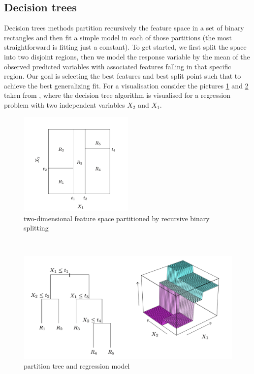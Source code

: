 \subsection{Decision trees}
Decision trees methods partition recursively the feature space in a set of binary rectangles and then fit a simple model in each of those partitions (the most straightforward is fitting just a constant).
To get started, we first split the space into two disjoint regions, then we model the response variable by the mean of the observed predicted variables with associated features falling in that specific region. Our goal is selecting the best features and best split point such that to achieve the best generalizing fit.
For a visualisation consider the pictures \ref{fig:elements_statistical_learning1} and \ref{fig:elements_statistical_learning2} taken from \cite{hastie2009elements}, where the decision tree algorithm is visualised for a regression problem with two independent variables $X_2$ and $X_1$.
\begin{figure}
    \includegraphics[width=0.5\textwidth]{images/elsii1.png}
    \caption{two-dimensional feature space partitioned by recursive binary splitting \cite{hastie2009elements}}
    \label{fig:elements_statistical_learning1}
  \end{figure}
\\
\begin{figure}
\includegraphics[width=1\textwidth]{images/elsii2.png}
\caption{partition tree and regression model \cite{hastie2009elements}}
\label{fig:elements_statistical_learning2}
\end{figure}
